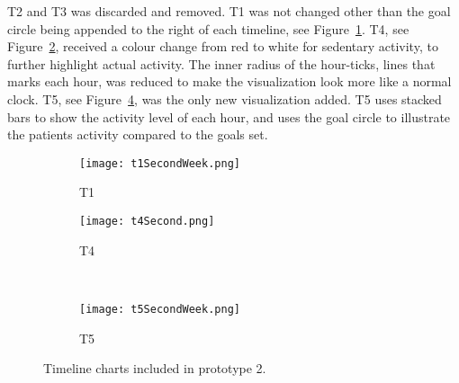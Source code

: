 T2 and T3 was discarded and removed. T1 was not changed other than the goal circle being appended to the right of each timeline, see Figure~\ref{fig:t1}. T4, see Figure~\ref{fig:t4}, received a colour change from red to white for sedentary activity, to further highlight actual activity. The inner radius of the hour-ticks, lines that marks each hour, was reduced to make the visualization look more like a normal clock. T5, see Figure~\ref{fig:t5}, was the only new visualization added. T5 uses stacked bars to show the activity level of each hour, and uses the goal circle to illustrate the patients activity compared to the goals set.

\begin{figure}[h!]
  \centering
  \begin{subfigure}[b]{0.6\textwidth}
    \centering
    \texttt{[image: t1SecondWeek.png]}
    \caption{T1}
    \label{fig:t1}
  \end{subfigure}
  \begin{subfigure}[b]{0.35\textwidth}
    \centering
    \texttt{[image: t4Second.png]}
    \caption{T4}
    \label{fig:t4}
  \end{subfigure}
  \\
  \begin{subfigure}[b]{0.95\textwidth}
    \centering
    \texttt{[image: t5SecondWeek.png]}
    \caption{T5}
    \label{fig:t5}
  \end{subfigure}
  \caption[Second version of T1, T4 and first version of T5]{Timeline charts included in prototype 2.}
\end{figure}
